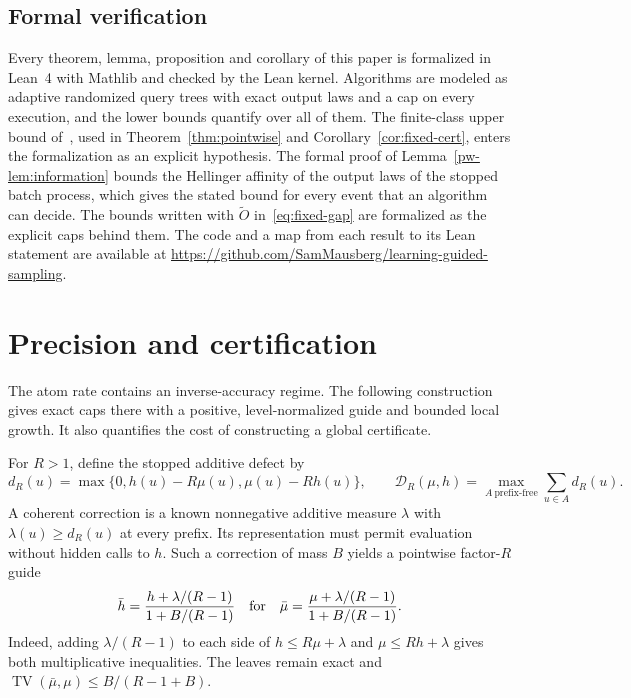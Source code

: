 \documentclass[11pt]{article}
\theoremstyle{definition}\newtheorem{definition}[theorem]{Definition}
\theoremstyle{remark}\newtheorem{remark}[theorem]{Remark}
\newcommand{\TV}{\operatorname{TV}}
\newcommand{\DD}{\mathcal D}
\begin{document}
\subsection{Formal verification}
Every theorem, lemma, proposition and corollary of this paper is formalized in Lean~4 with Mathlib and checked by the Lean kernel. Algorithms are modeled as adaptive randomized query trees with exact output laws and a cap on every execution, and the lower bounds quantify over all of them. The finite-class upper bound of~\cite[Theorem 3.2]{gmr}, used in Theorem~\ref{thm:pointwise} and Corollary~\ref{cor:fixed-cert}, enters the formalization as an explicit hypothesis. The formal proof of Lemma~\ref{pw-lem:information} bounds the Hellinger affinity of the output laws of the stopped batch process, which gives the stated bound for every event that an algorithm can decide. The bounds written with $\widetilde O$ in~\eqref{eq:fixed-gap} are formalized as the explicit caps behind them. The code and a map from each result to its Lean statement are available at \url{https://github.com/SamMausberg/learning-guided-sampling}.





\section{Precision and certification}\label{sec:construction}
The atom rate contains an inverse-accuracy regime. The following construction gives exact caps there with a positive, level-normalized guide and bounded local growth. It also quantifies the cost of constructing a global certificate.

For $R>1$, define the stopped additive defect by
\begin{equation}\label{eq:defect}
 d_R(u)=\max\{0,h(u)-R\mu(u),\mu(u)-Rh(u)\},\qquad
 \DD_R(\mu,h)=\max_{A\ \mathrm{prefix\text{-}free}}\sum_{u\in A}d_R(u).
\end{equation}
A coherent correction is a known nonnegative additive measure $\lambda$ with $\lambda(u)\ge d_R(u)$ at every prefix. Its representation must permit evaluation without hidden calls to $h$. Such a correction of mass $B$ yields a pointwise factor-$R$ guide
\[
 \bar h=\frac{h+\lambda/(R-1)}{1+B/(R-1)}
 \quad\hbox{for}\quad
 \bar\mu=\frac{\mu+\lambda/(R-1)}{1+B/(R-1)}.
\]
Indeed, adding $\lambda/(R-1)$ to each side of $h\le R\mu+\lambda$ and $\mu\le Rh+\lambda$ gives both multiplicative inequalities. The leaves remain exact and $\TV(\bar\mu,\mu)\le B/(R-1+B)$.
\end{document}
